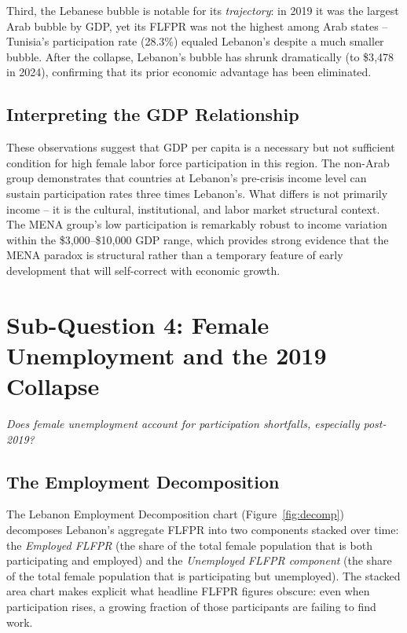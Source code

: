 \documentclass[12pt,a4paper]{article}
\begin{document}
Third, the Lebanese bubble is notable for its \textit{trajectory}: in 2019 it was the largest Arab bubble by GDP, yet its FLFPR was not the highest among Arab states -- Tunisia's participation rate (28.3\%) equaled Lebanon's despite a much smaller bubble. After the collapse, Lebanon's bubble has shrunk dramatically (to \$3{,}478 in 2024), confirming that its prior economic advantage has been eliminated.

\subsection{Interpreting the GDP Relationship}

These observations suggest that GDP per capita is a necessary but not sufficient condition for high female labor force participation in this region. The non-Arab group demonstrates that countries at Lebanon's pre-crisis income level can sustain participation rates three times Lebanon's. What differs is not primarily income -- it is the cultural, institutional, and labor market structural context. The MENA group's low participation is remarkably robust to income variation within the \$3{,}000--\$10{,}000 GDP range, which provides strong evidence that the MENA paradox is structural rather than a temporary feature of early development that will self-correct with economic growth.

\section{Sub-Question 4: Female Unemployment and the 2019 Collapse}
\label{sec:decomp}

\textit{Does female unemployment account for participation shortfalls, especially post-2019?}

\subsection{The Employment Decomposition}

The Lebanon Employment Decomposition chart (Figure~\ref{fig:decomp}) decomposes Lebanon's aggregate FLFPR into two components stacked over time: the \textit{Employed FLFPR} (the share of the total female population that is both participating and employed) and the \textit{Unemployed FLFPR component} (the share of the total female population that is participating but unemployed). The stacked area chart makes explicit what headline FLFPR figures obscure: even when participation rises, a growing fraction of those participants are failing to find work.
\end{document}
